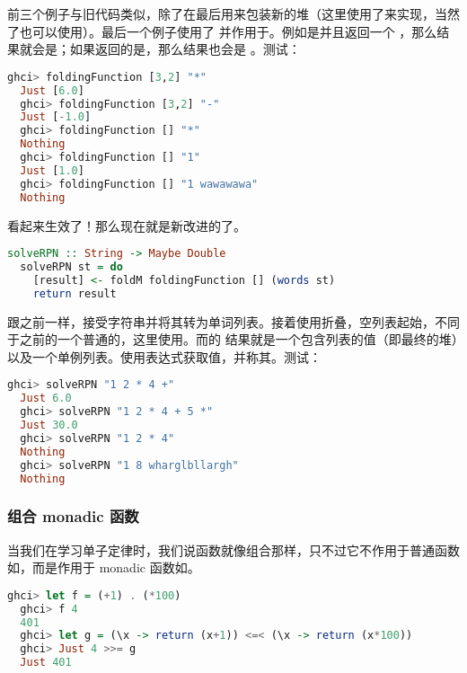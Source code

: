 \documentclass[./main.tex]{subfiles}
\begin{document}
前三个例子与旧代码类似，除了在最后用来包装新的堆（这里使用了来实现，当然了也可以使用）。最后一个例子使用了
并作用于。例如是\acode{[1.o,2.0]}并且返回一个
，那么结果就会是；如果返回的是，那么结果也会是
。测试：

\begin{lstlisting}[language=Haskell]
  ghci> foldingFunction [3,2] "*"
  Just [6.0]
  ghci> foldingFunction [3,2] "-"
  Just [-1.0]
  ghci> foldingFunction [] "*"
  Nothing
  ghci> foldingFunction [] "1"
  Just [1.0]
  ghci> foldingFunction [] "1 wawawawa"
  Nothing
\end{lstlisting}

看起来生效了！那么现在就是新改进的了。

\begin{lstlisting}[language=Haskell]
  solveRPN :: String -> Maybe Double
  solveRPN st = do
    [result] <- foldM foldingFunction [] (words st)
    return result
\end{lstlisting}

跟之前一样，接受字符串并将其转为单词列表。接着使用折叠，空列表起始，不同于之前的一个普通的，这里使用。而的
结果就是一个包含列表的值（即最终的堆）以及一个单例列表。使用表达式获取值，并称其。测试：

\begin{lstlisting}[language=Haskell]
  ghci> solveRPN "1 2 * 4 +"
  Just 6.0
  ghci> solveRPN "1 2 * 4 + 5 *"
  Just 30.0
  ghci> solveRPN "1 2 * 4"
  Nothing
  ghci> solveRPN "1 8 wharglbllargh"
  Nothing
\end{lstlisting}

\subsubsection*{组合 monadic 函数}

当我们在学习单子定律时，我们说\acode{<=<}函数就像组合那样，只不过它不作用于普通函数如，而是作用于 monadic 函数如。

\begin{lstlisting}[language=Haskell]
  ghci> let f = (+1) . (*100)
  ghci> f 4
  401
  ghci> let g = (\x -> return (x+1)) <=< (\x -> return (x*100))
  ghci> Just 4 >>= g
  Just 401
\end{lstlisting}
\end{document}

